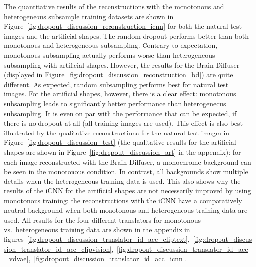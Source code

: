 The quantitative results of the reconstructions with the monotonous and heterogeneous subsample training datasets are shown in Figure~\ref{fig:dropout_discussion_reconstruction_icnn} for both the natural test images and the artificial shapes. The random dropout performs better than both monotonous and heterogeneous subsampling. Contrary to expectation, monotonous subsampling actually performs worse than heterogeneous subsampling with artificial shapes. However, the results for the Brain-Diffuser (displayed in Figure~\ref{fig:dropout_discussion_reconstruction_bd}) are quite different. As expected, random subsampling performs best for natural test images. For the artificial shapes, however, there is a clear effect: monotonous subsampling leads to significantly better performance than heterogeneous subsampling. It is even on par with the performance that can be expected, if there is no dropout at all (all training images are used). This effect is also best illustrated by the qualitative reconstructions for the natural test images in Figure~\ref{fig:dropout_discussion_test} (the qualitative results for the artificial shapes are shown in Figure~\ref{fig:dropout_discussion_art} in the appendix): for each image reconstructed with the Brain-Diffuser, a monochrome background can be seen in the monotonous condition. In contrast, all backgrounds show multiple details when the heterogeneous training data is used. This also shows why the results of the iCNN for the artificial shapes are not necessarily improved by using monotonous training: the reconstructions with the iCNN have a comparatively neutral background when both monotonous and heterogeneous training data are used. All results for the four different translators for monotonous vs.\ heterogeneous training data are shown in the appendix in figures~\ref{fig:dropout_discussion_translator_id_acc_cliptext},~\ref{fig:dropout_discussion_translator_id_acc_clipvision},~\ref{fig:dropout_discussion_translator_id_acc_vdvae},~\ref{fig:dropout_discussion_translator_id_acc_icnn}. 

